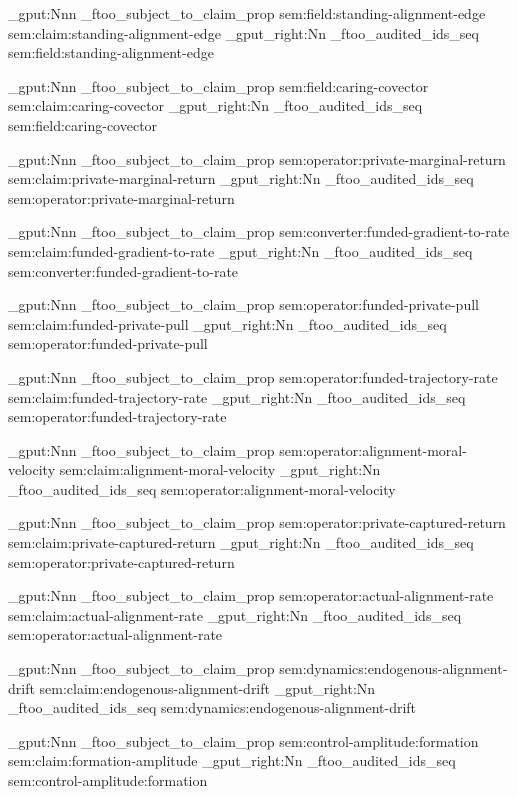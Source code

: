 \prop_gput:Nnn \g_ftoo_subject_to_claim_prop { sem:field:standing-alignment-edge } { sem:claim:standing-alignment-edge }
\seq_gput_right:Nn \g_ftoo_audited_ids_seq { sem:field:standing-alignment-edge }

\prop_gput:Nnn \g_ftoo_subject_to_claim_prop { sem:field:caring-covector } { sem:claim:caring-covector }
\seq_gput_right:Nn \g_ftoo_audited_ids_seq { sem:field:caring-covector }

\prop_gput:Nnn \g_ftoo_subject_to_claim_prop { sem:operator:private-marginal-return } { sem:claim:private-marginal-return }
\seq_gput_right:Nn \g_ftoo_audited_ids_seq { sem:operator:private-marginal-return }

\prop_gput:Nnn \g_ftoo_subject_to_claim_prop { sem:converter:funded-gradient-to-rate } { sem:claim:funded-gradient-to-rate }
\seq_gput_right:Nn \g_ftoo_audited_ids_seq { sem:converter:funded-gradient-to-rate }

\prop_gput:Nnn \g_ftoo_subject_to_claim_prop { sem:operator:funded-private-pull } { sem:claim:funded-private-pull }
\seq_gput_right:Nn \g_ftoo_audited_ids_seq { sem:operator:funded-private-pull }

\prop_gput:Nnn \g_ftoo_subject_to_claim_prop { sem:operator:funded-trajectory-rate } { sem:claim:funded-trajectory-rate }
\seq_gput_right:Nn \g_ftoo_audited_ids_seq { sem:operator:funded-trajectory-rate }

\prop_gput:Nnn \g_ftoo_subject_to_claim_prop { sem:operator:alignment-moral-velocity } { sem:claim:alignment-moral-velocity }
\seq_gput_right:Nn \g_ftoo_audited_ids_seq { sem:operator:alignment-moral-velocity }

\prop_gput:Nnn \g_ftoo_subject_to_claim_prop { sem:operator:private-captured-return } { sem:claim:private-captured-return }
\seq_gput_right:Nn \g_ftoo_audited_ids_seq { sem:operator:private-captured-return }

\prop_gput:Nnn \g_ftoo_subject_to_claim_prop { sem:operator:actual-alignment-rate } { sem:claim:actual-alignment-rate }
\seq_gput_right:Nn \g_ftoo_audited_ids_seq { sem:operator:actual-alignment-rate }

\prop_gput:Nnn \g_ftoo_subject_to_claim_prop { sem:dynamics:endogenous-alignment-drift } { sem:claim:endogenous-alignment-drift }
\seq_gput_right:Nn \g_ftoo_audited_ids_seq { sem:dynamics:endogenous-alignment-drift }

\prop_gput:Nnn \g_ftoo_subject_to_claim_prop { sem:control-amplitude:formation } { sem:claim:formation-amplitude }
\seq_gput_right:Nn \g_ftoo_audited_ids_seq { sem:control-amplitude:formation }

